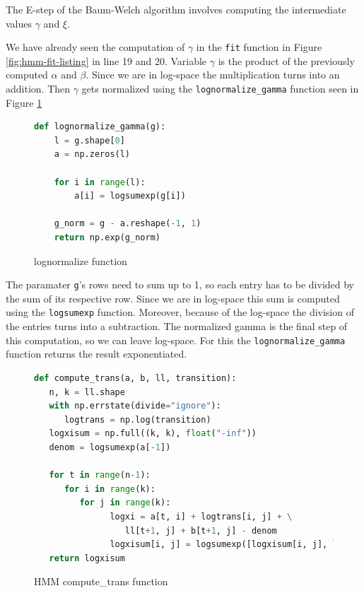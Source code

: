 The E-step of the Baum-Welch algorithm involves computing the intermediate values $\gamma$ and $\xi$. 

We have already seen the computation of $\gamma$ in the \texttt{fit} function in Figure \ref{fig:hmm-fit-listing} in line 19 and 20. Variable $\gamma$ is the product of the previously computed $\alpha$ and $\beta$. Since we are in log-space the multiplication turns into an addition. Then $\gamma$ gets normalized using the \texttt{lognormalize\_gamma} function seen in Figure \ref{fig:lognormalize-listing}

\begin{figure}
\begin{singlespace}
\begin{lstlisting}[language=Python]
   def lognormalize_gamma(g):
    l = g.shape[0]
    a = np.zeros(l)

    for i in range(l):
        a[i] = logsumexp(g[i])

    g_norm = g - a.reshape(-1, 1)
    return np.exp(g_norm)
\end{lstlisting}
\end{singlespace}
\caption{lognormalize function}    
\label{fig:lognormalize-listing}
\end{figure}

The paramater \texttt{g}'s rows need to sum up to 1, so each entry has to be divided by the sum of its respective row. Since we are in log-space this sum is computed using the \texttt{logsumexp} function. Moreover, because of the log-space the division of the entries turns into a subtraction. The normalized gamma is the final step of this computation, so we can leave log-space. For this the \texttt{lognormalize\_gamma} function returns the result exponentiated. 


\begin{figure}
\begin{singlespace}
\begin{lstlisting}[language=Python]
def compute_trans(a, b, ll, transition):
   n, k = ll.shape
   with np.errstate(divide="ignore"):
      logtrans = np.log(transition)
   logxisum = np.full((k, k), float("-inf"))
   denom = logsumexp(a[-1])

   for t in range(n-1):
      for i in range(k):
         for j in range(k):
               logxi = a[t, i] + logtrans[i, j] + \
                  ll[t+1, j] + b[t+1, j] - denom
               logxisum[i, j] = logsumexp([logxisum[i, j], logxi])
   return logxisum
\end{lstlisting}
\end{singlespace}
\caption{HMM compute\_trans function}    
\label{fig:hmm-computetrans-listing}
\end{figure}

